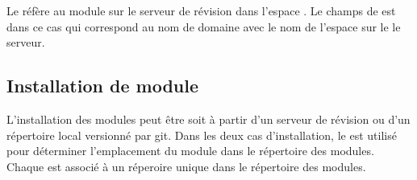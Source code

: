 Le   réfère
au module  sur le serveur de révision 
dans l'espace . Le champs  de est dans ce
cas  qui correspond au nom de domaine avec
le nom de l'espace sur le le serveur.


\subsection{Installation de module}

L'installation des modules peut être soit à partir d'un serveur de révision
ou d'un répertoire local versionné par git. Dans les deux cas d'installation,
le   est utilisé pour déterminer l'emplacement du module
dans le répertoire des modules. Chaque  est associé à un
réperoire unique dans le répertoire des modules.







